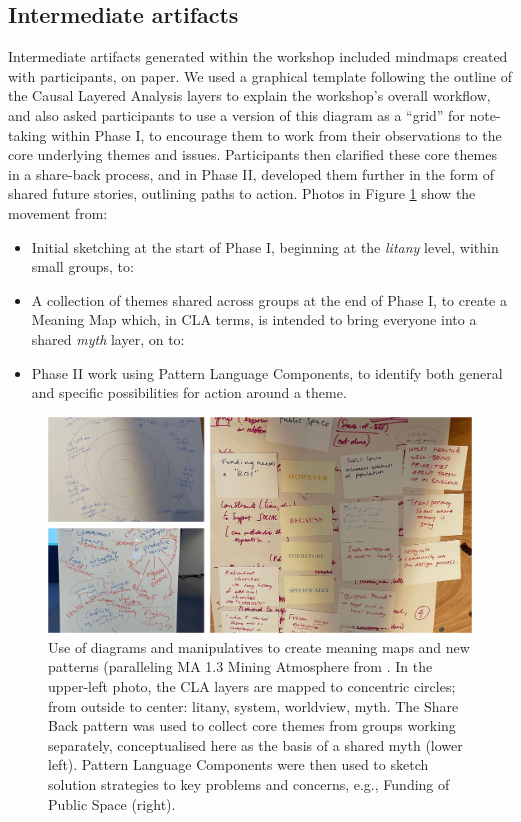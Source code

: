 \documentclass[acmlarge,timestamp]{acmart}
\DeclareRobustCommand{\scitshape}{\fontshape{\scitdefault}\selectfont}
\begin{document}
\subsection{Intermediate artifacts}

Intermediate artifacts generated within the workshop included mindmaps
created with participants, on paper.  We used a graphical template
following the outline of the Causal Layered Analysis layers to explain
the workshop’s overall workflow, and also asked participants to use a
version of this diagram as a “grid” for note-taking within Phase I, to
encourage them to work from their observations to the core underlying
themes and issues.  Participants then clarified these core themes in a
share-back process, and in Phase II, developed them further in the
form of shared future stories, outlining paths to action.  Photos in
Figure \ref{ExampleParticipantPattern} show the movement from:
\begin{itemize}
  \item Initial sketching at the start of Phase I, beginning at the
    \emph{litany} level, within small groups, to:
  \item A collection of themes shared across groups at the end of
    Phase I, to create a {\sc Meaning Map} which, in CLA terms, is
    intended to bring everyone into a shared \emph{myth} layer, on to:
  \item Phase II work using {\sc Pattern Language Components}, to
    identify both general and specific possibilities for action around
    a theme.
\end{itemize}

\begin{figure}
  \includegraphics[width=\textwidth]{PatternProcess.png}
  \caption{Use of diagrams and manipulatives to create meaning maps
    and new patterns (paralleling {\scitshape MA 1.3 Mining
      Atmosphere} from \citet{iba2016pattern}. In the upper-left
    photo, the CLA layers are mapped to concentric circles; from
    outside to center: litany, system, worldview, myth.  The {\sc
      Share Back} pattern was used to collect core themes from groups
    working separately, conceptualised here as the basis of a shared
    myth (lower left).  {\sc Pattern Language Components} were then
    used to sketch solution strategies to key problems and concerns,
    e.g., {\sc Funding of Public Space}
    (right). \label{ExampleParticipantPattern}}
\end{figure}
\end{document}
